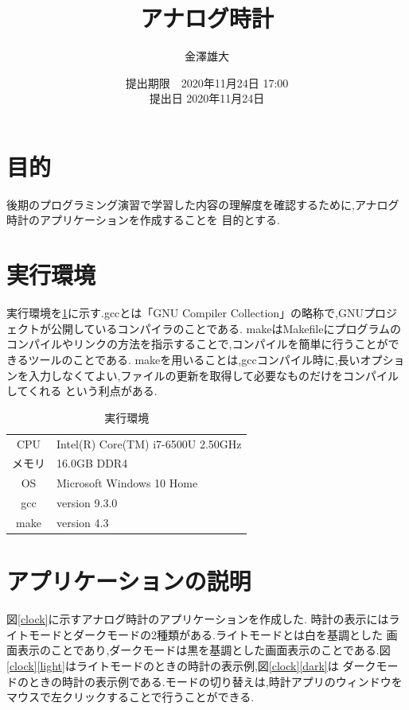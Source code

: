 \documentclass[a4j]{jarticle}
\title{アナログ時計}
\date{提出期限　2020年11月24日 17:00 \\ 提出日 2020年11月24日}
\author{金澤雄大}
\begin{document}
    \maketitle
    \thispagestyle{empty}
    \clearpage
    \addtocounter{page}{-1}
    \section{目的}
    後期のプログラミング演習で学習した内容の理解度を確認するために,アナログ時計のアプリケーションを作成することを
    目的とする.

    \section{実行環境}
    実行環境を\ref{env}に示す.gccとは「GNU Compiler Collection」の略称で,GNUプロジェクトが公開しているコンパイラのことである.
    makeはMakefileにプログラムのコンパイルやリンクの方法を指示することで,コンパイルを簡単に行うことができるツールのことである.
    makeを用いることは,gccコンパイル時に,長いオプションを入力しなくてよい,ファイルの更新を取得して必要なものだけをコンパイルしてくれる
    という利点がある.

    \begin{table}[H]
      \caption{実行環境}
    \label{env}
    \begin{center}
        \begin{tabular}{c|l}\hline
          CPU & Intel(R) Core(TM) i7-6500U 2.50GHz  \\ 
          メモリ & 16.0GB DDR4 \\
          OS & Microsoft Windows 10 Home \\
          gcc &  version 9.3.0 \\
          make & version 4.3 \\ \hline
        \end{tabular}
    \end{center}
    \end{table}

    \section{アプリケーションの説明}
    \label{s3}
    図\ref{clock}に示すアナログ時計のアプリケーションを作成した.
    時計の表示にはライトモードとダークモードの2種類がある.ライトモードとは白を基調とした
    画面表示のことであり,ダークモードは黒を基調とした画面表示のことである.図\ref{clock}\ref{light}はライトモードのときの時計の表示例,図\ref{clock}\ref{dark}は
    ダークモードのときの時計の表示例である.モードの切り替えは,時計アプリのウィンドウをマウスで左クリックすることで行うことができる.
\end{document}
